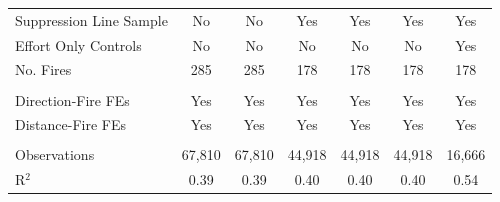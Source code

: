 \begin{tabular}{lcccccc}
   Suppression Line Sample   & No             & No             & Yes            & Yes            & Yes            & Yes\\  
   Effort Only Controls      & No             & No             & No             & No             & No             & Yes\\  
   No. Fires                 & 285            & 285            & 178            & 178            & 178            & 178\\  
    \\
   Direction-Fire FEs        & Yes            & Yes            & Yes            & Yes            & Yes            & Yes\\  
   Distance-Fire FEs         & Yes            & Yes            & Yes            & Yes            & Yes            & Yes\\  
    \\
   Observations              & 67,810         & 67,810         & 44,918         & 44,918         & 44,918         & 16,666\\  
   R$^2$                     & 0.39           & 0.39           & 0.40           & 0.40           & 0.40           & 0.54\\  
   \bottomrule
\end{tabular}
\par\endgroup
